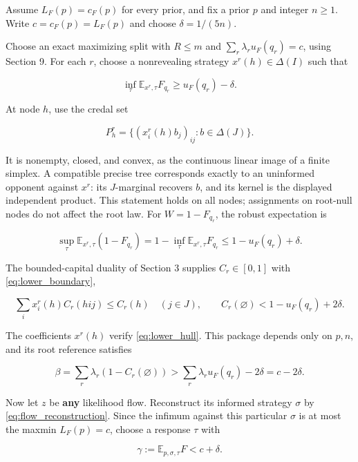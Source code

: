 \documentclass[11pt,a4paper]{article}
\begin{document}
Assume \(L_F(p)=c_F(p)\) for every prior, and fix a prior \(p\) and integer \(n\ge1\). Write \(c=c_F(p)=L_F(p)\) and choose \(\delta=1/(5n)\).

Choose an exact maximizing split with \(R\le m\) and \(\sum_r\lambda_ru_F(q_r)=c\), using Section 9. For each \(r\), choose a nonrevealing strategy \(x^r(h)\in\Delta(I)\) such that

\begin{equation}
\inf_\tau\mathbb E_{x^r,\tau}F_{q_r}\ge u_F(q_r)-\delta.
\label{eq:nonrevealing_guarantee}
\end{equation}

At node \(h\), use the credal set

\[
P^r_h=\{(x^r_i(h)b_j)_{ij}:b\in\Delta(J)\}.
\]

It is nonempty, closed, and convex, as the continuous linear image of a finite simplex. A compatible precise tree corresponds exactly to an uninformed opponent against \(x^r\): its \(J\)-marginal recovers \(b\), and its kernel is the displayed independent product. This statement holds on all nodes; assignments on root-null nodes do not affect the root law. For \(W=1-F_{q_r}\), the robust expectation is

\[
\sup_\tau\mathbb E_{x^r,\tau}(1-F_{q_r})
=1-\inf_\tau\mathbb E_{x^r,\tau}F_{q_r}
\le1-u_F(q_r)+\delta.
\]

The bounded-capital duality of Section 3 supplies \(C_r\in[0,1]\) with \eqref{eq:lower_boundary},

\[
\sum_i x^r_i(h)C_r(hij)\le C_r(h)\quad(j\in J),
\qquad C_r(\varnothing)<1-u_F(q_r)+2\delta.
\]

The coefficients \(x^r(h)\) verify \eqref{eq:lower_hull}. This package depends only on \(p,n\), and its root reference satisfies

\begin{equation}
\beta=\sum_r\lambda_r(1-C_r(\varnothing))
>\sum_r\lambda_r u_F(q_r)-2\delta=c-2\delta.
\label{eq:reference_cost}
\end{equation}

Now let \(z\) be \textbf{any} likelihood flow. Reconstruct its informed strategy \(\sigma\) by \eqref{eq:flow_reconstruction}. Since the infimum against this particular \(\sigma\) is at most the maxmin \(L_F(p)=c\), choose a response \(\tau\) with

\begin{equation}
\gamma:=\mathbb E_{p,\sigma,\tau}F<c+\delta. \label{eq:tailored_response}
\end{equation}
\end{document}
